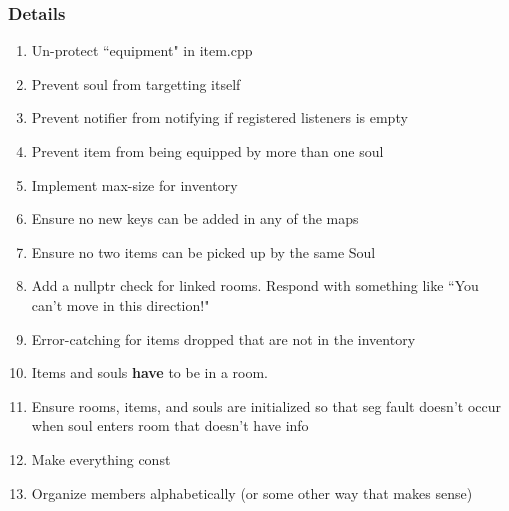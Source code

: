 \documentclass{article}
\begin{document}
\subsubsection*{Details}
\begin{enumerate}
    \item Un-protect ``equipment" in item.cpp
    \item Prevent soul from targetting itself
    \item Prevent notifier from notifying if registered listeners is empty
    \item Prevent item from being equipped by more than one soul
    \item Implement max-size for inventory
    \item Ensure no new keys can be added in any of the maps
    \item Ensure no two items can be picked up by the same Soul
    \item Add a nullptr check for linked rooms. Respond with something
        like ``You can't move in this direction!" \checkmark
    \item Error-catching for items dropped that are not in the inventory
    \item Items and souls \textbf{have} to be in a room. \checkmark
    \item Ensure rooms, items, and souls are initialized so that seg
        fault doesn't occur when soul enters room that doesn't have
        info
    \item Make everything const
    \item Organize members alphabetically (or some other way that
        makes sense)
\end{enumerate}
\end{document}

